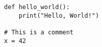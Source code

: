 \documentclass{article}
\begin{document}
\begin{lstlisting}
def hello_world():
    print("Hello, World!")

# This is a comment
x = 42
\end{lstlisting}
\end{document}
